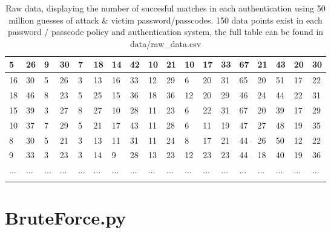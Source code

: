 \documentclass[british,11pt,a4paper]{article}
\begin{document}
\begin{appendices}
\begin{longtable}{|l|l|l|l|l|l|l|l|l|l|l|l|l|l|l|l|l|l|}
	5 & 26 & 9 & 30 & 7 & 18 & 14 & 42 & 10 & 21 & 10 & 17 & 33 & 67 & 21 & 43 & 20 & 30 \\ \hline
	16 & 30 & 5 & 26 & 3 & 13 & 16 & 33 & 12 & 29 & 6 & 20 & 31 & 65 & 20 & 51 & 17 & 22 \\ \hline
	18 & 46 & 8 & 23 & 5 & 25 & 15 & 36 & 18 & 36 & 12 & 20 & 29 & 46 & 24 & 44 & 22 & 31 \\ \hline
	15 & 39 & 3 & 27 & 8 & 27 & 10 & 28 & 11 & 23 & 6 & 22 & 31 & 67 & 20 & 39 & 17 & 29 \\ \hline
	10 & 37 & 7 & 29 & 5 & 21 & 17 & 43 & 11 & 28 & 6 & 11 & 19 & 47 & 27 & 48 & 19 & 35 \\ \hline
	8 & 30 & 5 & 21 & 3 & 13 & 11 & 31 & 11 & 24 & 8 & 17 & 21 & 44 & 26 & 50 & 12 & 22 \\ \hline
	9 & 33 & 3 & 23 & 3 & 14 & 9 & 28 & 13 & 23 & 12 & 23 & 23 & 44 & 18 & 40 & 19 & 36 \\ \hline
	... & ... & ...& ... & ...& ... & ...& ... & ... & ... & ...& ... & ... & ... & ... & ... & ... & ... \\ \hline
		\caption{Raw data, displaying the number of succesful matches in each authentication using 50 million guesses of attack \& victim password/passcodes. 150 data points exist in each password / passcode policy and authentication system, the full table can be found in data/raw\_data.csv}
	\label{tab:raw_data}
	\end{longtable}

	\clearpage

	\section{BruteForce.py}\label{app:bruteforce}
	
	\clearpage


\end{appendices}
\end{document}
